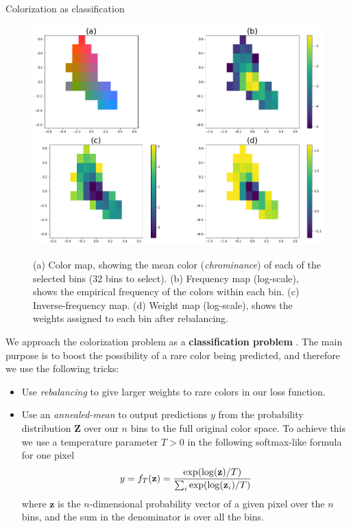 \documentclass[final]{beamer}
\newlength{\onecolwid}
\begin{document}
\begin{frame}[t]
\begin{columns}[t]
\begin{column}{\onecolwid}
\begin{block}{Colorization as classification}
  \begin{figure}
  \begin{center}
  \includegraphics[width=\linewidth]{cdexample}\label{colormap}
  \caption{ (a) Color map, showing the mean color (\textit{chrominance}) of each of the selected bins (32 bins to select). (b) Frequency map (log-scale), shows the empirical frequency of the colors within each bin. (c) Inverse-frequency map. (d) Weight map (log-scale), shows the weights assigned to each bin after rebalancing.}
  \end{center}
  \end{figure}

We approach the colorization problem as a \textbf{classification problem} \cite{zhang2016colorful}. The main purpose is to boost the possibility of a rare color being predicted, and therefore we use the following tricks:
\begin{itemize}
\item Use \textit{rebalancing} to give larger weights to rare colors in our loss function.
\item Use an \textit{annealed-mean} to output predictions $y$ from the probability distribution $\textbf{Z}$ over our $n$ bins to the full original color space. To achieve this we use a temperature parameter $T > 0$ in the following softmax-like formula for one pixel $$y = f_T(\textbf{z}) = {\exp(\log(\textbf{z}) / T) \over \sum_i \exp(\log(\textbf{z}_i) / T)}$$ where $\textbf{z}$ is the $n$-dimensional probability vector of a given pixel over the $n$ bins, and the sum in the denominator is over all the bins.
\end{itemize}





\end{block}
\end{column}
\end{columns}
\end{frame}
\end{document}
